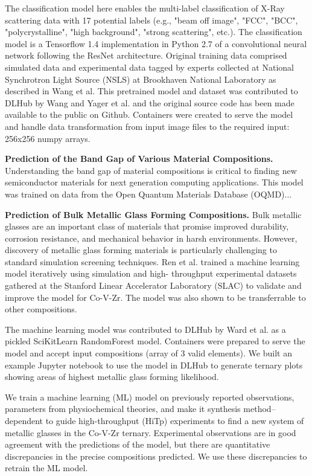 \documentclass{aip-cp}
\newcommand\ben[1]{}
\newcommand\ben[1]{{\color{blue}[Ben: #1]}}
\begin{document}
The classification model here enables the multi-label classification of X-Ray
scattering data with 17 potential labels (e.g., "beam off image", "FCC",
"BCC", "polycrystalline", "high background", "strong scattering", etc.). The
classification model is a Tensorflow 1.4 implementation in Python 2.7 of a
convolutional neural network following the ResNet architecture. Original
training data comprised simulated data and experimental data tagged by experts
collected at National Synchrotron Light Source (NSLS) at Brookhaven National
Laboratory as described in Wang et al. This pretrained model and dataset was
contributed to DLHub by Wang and Yager et al. and the original source code has
been made available to the public on Github. Containers were created to serve
the model and handle data transformation from input image files to the
required input: 256x256 numpy arrays.

\ben{Add DLHub usage details here}


\textbf{Prediction of the Band Gap of Various Material Compositions.}
Understanding the band gap of material compositions is critical
to finding new semiconductor materials for next generation computing
applications. This model was trained on data from the Open Quantum Materials
Database (OQMD)...
\ben{More model details}
\ben{Add DLHub usage details here}

\textbf{Prediction of Bulk Metallic Glass Forming Compositions.}
Bulk metallic glasses are an important class of materials that promise
improved durability, corrosion resistance, and mechanical behavior in harsh
environments. However, discovery of metallic glass forming materials is
particularly challenging to standard simulation screening techniques. Ren et
al. trained a machine learning model iteratively using simulation and high-
throughput experimental datasets gathered at the Stanford Linear Accelerator
Laboratory (SLAC) to validate and improve the model for Co-V-Zr. The model was
also shown to be transferrable to other compositions.

The machine learning model was contributed to DLHub by Ward et al. as a
pickled SciKitLearn RandomForest model. Containers were prepared to serve the
model and accept input compositions (array of 3 valid elements). We built an
example Jupyter notebook  to use the model in DLHub to generate ternary plots
showing areas of highest metallic glass forming likelihood.

\ben{cite https://github.com/fang-ren/}

We train a machine learning (ML) model on previously reported observations,
parameters from physiochemical theories, and make it synthesis
method–dependent to guide high-throughput (HiTp) experiments to find a new
system of metallic glasses in the Co-V-Zr ternary. Experimental observations
are in good agreement with the predictions of the model, but there are
quantitative discrepancies in the precise compositions predicted. We use these
discrepancies to retrain the ML model.
\end{document}
